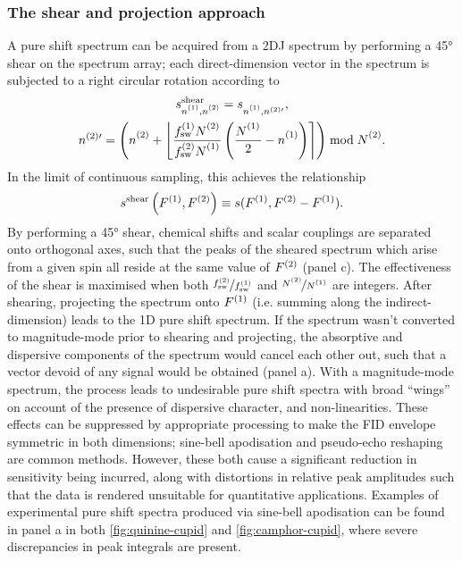 \subsubsection{The shear and projection approach}
A pure shift spectrum can be acquired from a \ac{2DJ} spectrum by performing a
\ang{45} shear on the spectrum array; each direct-dimension vector in the
spectrum is subjected to a right circular rotation according to
\begin{subequations}
    \begin{gather}
        s_{\none,\ntwo}^{\text{shear}} =
            s_{\none,n^{(2)\prime}}^{\vphantom{{\text{tilt}}}},\\
        n^{(2)\prime} = \left(\ntwo + \left\lfloor
                \frac
                    {\fswone \Ntwo\vpsub{\mathrm{sw}}}
                    {\fswtwo \None\vpsub{\mathrm{sw}}}
                \left(
                    \frac{\None\vpsub{\mathrm{sw}}}{2} - \none
                \right)
            \right\rceil
        \right) \bmod \Ntwo.
    \end{gather}
\end{subequations}
In the limit of continuous sampling, this achieves the relationship
\[
    s^{\text{shear}}\left(F^{(1)},F^{(2)}\right) \equiv s(F^{(1)}, F^{(2)} - F^{(1)}).
\]
By performing a \ang{45} shear, chemical shifts and scalar couplings are
separated onto orthogonal axes,
such that the peaks of the sheared spectrum which arise from a given spin all
reside at the same value of $F^{(2)}$ (panel c). The
effectiveness of the shear is maximised when both $\nicefrac{f_{\mathrm{sw}}^{(2)}}{f_{\mathrm{sw}}^{(1)}}$
and $\nicefrac{\Ntwo}{\None}$ are integers. After shearing, projecting the
spectrum onto $F^{(1)}$ (i.e. summing along the indirect-dimension) leads
to the \ac{1D} pure shift spectrum.
If the spectrum wasn't converted to magnitude-mode prior to shearing and
projecting, the absorptive and dispersive components of the spectrum would
cancel each other out, such that a vector devoid of any signal would be
obtained (panel a).
With a magnitude-mode spectrum, the process leads to undesirable pure shift
spectra with broad ``wings'' on account of the presence of dispersive
character, and non-linearities. These effects can be suppressed by appropriate
processing to make the FID envelope symmetric in both dimensions;
sine-bell apodisation and pseudo-echo reshaping\cite{Bax1981} are common methods.
However, these both cause a significant reduction in sensitivity being
incurred, along with distortions in relative peak amplitudes such that the data is
rendered unsuitable for quantitative applications. Examples of experimental
pure shift spectra produced via sine-bell apodisation can be found in panel a
in both \cref{fig:quinine-cupid} and \cref{fig:camphor-cupid}, where severe
discrepancies in peak integrals are present.

